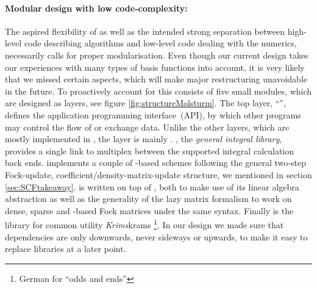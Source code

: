 \paragraph{Modular design with low code-complexity:}
The aspired flexibility of \molsturm as well as the intended
strong separation between high-level code describing algorithms
and low-level code dealing with the numerics,
necessarily calls for proper modularisation.
Even though our current design takes our experiences with many types
of basis functions into account,
it is very likely that we missed certain aspects,
which will make major restructuring unavoidable in the future.
To proactively account for this \molsturm consists of five small modules,
which are designed as layers, see figure \vref{fig:structureMolsturm}.
The top layer, ``\molsturm'', defines the application programming interface~(API),
by which other programs may control the flow of \molsturm or exchange data.
Unlike the other layers, which are mostly implemented in \cpp,
the \molsturm layer is mainly \python.
\gint, the \textit{general integral library},
provides a single link to multiplex between the supported integral calculation back ends.
\gscf implements a couple of \contraction-based \SCF schemes
following the general two-step Fock-update, coefficient/density-matrix-update structure,
we mentioned in section \ref{sec:SCFtakeaway}.
\gscf is written on top of \lazyten,
both to make use of its linear algebra abstraction
as well as the generality of the lazy matrix formalism
to work on dense, sparse and \contraction-based Fock matrices
under the same syntax.
Finally \krims is the library for common utility \textit{Krims}krams%
\footnote{German for ``odds and ends''}.
In our design we made sure
that dependencies are only downwards, never sideways or upwards,
to make it easy to replace libraries at a later point.
%
%
